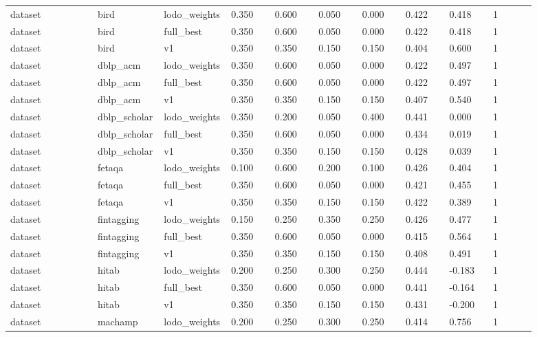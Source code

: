 \begin{landscape}
\begin{longtable}{p{0.162\linewidth}p{0.081\linewidth}p{0.081\linewidth}p{0.081\linewidth}p{0.081\linewidth}p{0.081\linewidth}p{0.081\linewidth}p{0.081\linewidth}p{0.081\linewidth}p{0.081\linewidth}}
dataset & bird & lodo\_\allowbreak{}weights & 0.350 & 0.600 & 0.050 & 0.000 & 0.422 & 0.418 & 1 \\
dataset & bird & full\_\allowbreak{}best & 0.350 & 0.600 & 0.050 & 0.000 & 0.422 & 0.418 & 1 \\
dataset & bird & v1 & 0.350 & 0.350 & 0.150 & 0.150 & 0.404 & 0.600 & 1 \\
dataset & dblp\_\allowbreak{}acm & lodo\_\allowbreak{}weights & 0.350 & 0.600 & 0.050 & 0.000 & 0.422 & 0.497 & 1 \\
dataset & dblp\_\allowbreak{}acm & full\_\allowbreak{}best & 0.350 & 0.600 & 0.050 & 0.000 & 0.422 & 0.497 & 1 \\
dataset & dblp\_\allowbreak{}acm & v1 & 0.350 & 0.350 & 0.150 & 0.150 & 0.407 & 0.540 & 1 \\
dataset & dblp\_\allowbreak{}scholar & lodo\_\allowbreak{}weights & 0.350 & 0.200 & 0.050 & 0.400 & 0.441 & 0.000 & 1 \\
dataset & dblp\_\allowbreak{}scholar & full\_\allowbreak{}best & 0.350 & 0.600 & 0.050 & 0.000 & 0.434 & 0.019 & 1 \\
dataset & dblp\_\allowbreak{}scholar & v1 & 0.350 & 0.350 & 0.150 & 0.150 & 0.428 & 0.039 & 1 \\
dataset & fetaqa & lodo\_\allowbreak{}weights & 0.100 & 0.600 & 0.200 & 0.100 & 0.426 & 0.404 & 1 \\
dataset & fetaqa & full\_\allowbreak{}best & 0.350 & 0.600 & 0.050 & 0.000 & 0.421 & 0.455 & 1 \\
dataset & fetaqa & v1 & 0.350 & 0.350 & 0.150 & 0.150 & 0.422 & 0.389 & 1 \\
dataset & fintagging & lodo\_\allowbreak{}weights & 0.150 & 0.250 & 0.350 & 0.250 & 0.426 & 0.477 & 1 \\
dataset & fintagging & full\_\allowbreak{}best & 0.350 & 0.600 & 0.050 & 0.000 & 0.415 & 0.564 & 1 \\
dataset & fintagging & v1 & 0.350 & 0.350 & 0.150 & 0.150 & 0.408 & 0.491 & 1 \\
dataset & hitab & lodo\_\allowbreak{}weights & 0.200 & 0.250 & 0.300 & 0.250 & 0.444 & -0.183 & 1 \\
dataset & hitab & full\_\allowbreak{}best & 0.350 & 0.600 & 0.050 & 0.000 & 0.441 & -0.164 & 1 \\
dataset & hitab & v1 & 0.350 & 0.350 & 0.150 & 0.150 & 0.431 & -0.200 & 1 \\
dataset & machamp & lodo\_\allowbreak{}weights & 0.200 & 0.250 & 0.300 & 0.250 & 0.414 & 0.756 & 1 \\

\end{longtable}
\end{landscape}
